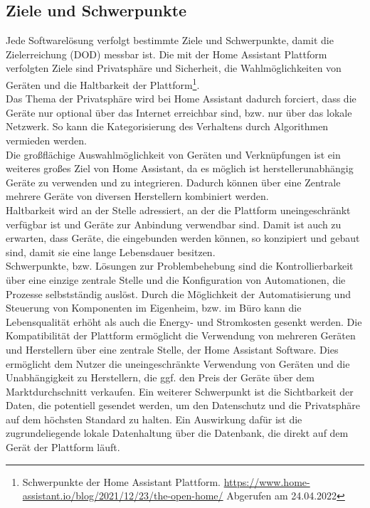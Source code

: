 \subsection{Ziele und Schwerpunkte}
    Jede Softwarelösung verfolgt bestimmte Ziele und Schwerpunkte, damit die Zielerreichung (\ac{DOD}) messbar ist. Die mit 
    der Home Assistant Plattform verfolgten Ziele sind Privatsphäre und Sicherheit, die Wahlmöglichkeiten von Geräten und die Haltbarkeit 
    der Plattform\footnote{Schwerpunkte der Home Assistant Plattform. \url{https://www.home-assistant.io/blog/2021/12/23/the-open-home/} Abgerufen am 24.04.2022}. 
    \\
    \linebreak
    Das Thema der Privatsphäre wird bei Home Assistant dadurch forciert, dass die Geräte nur optional über das Internet erreichbar sind, bzw. 
    nur über das lokale Netzwerk. So kann die Kategorisierung des Verhaltens durch Algorithmen vermieden werden. 
    \\
    Die großflächige Auswahlmöglichkeit von Geräten und Verknüpfungen ist ein weiteres großes Ziel von Home Assistant, da es möglich ist  
    herstellerunabhängig Geräte zu verwenden und zu integrieren. Dadurch können über eine Zentrale mehrere Geräte von diversen Herstellern 
    kombiniert werden.
    \\
    Haltbarkeit wird an der Stelle adressiert, an der die Plattform uneingeschränkt verfügbar ist und Geräte zur Anbindung verwendbar sind. 
    Damit ist auch zu erwarten, dass Geräte, die eingebunden werden können, so konzipiert und gebaut sind, damit sie eine lange Lebensdauer 
    besitzen.
    \\
    \linebreak
    Schwerpunkte, bzw. Lösungen zur Problembehebung sind die Kontrollierbarkeit über eine einzige zentrale Stelle und die Konfiguration von 
    Automationen, die Prozesse selbstständig auslöst. Durch die Möglichkeit der Automatisierung und Steuerung von Komponenten im Eigenheim, 
    bzw. im Büro kann die Lebensqualität erhöht als auch die Energy- und Stromkosten gesenkt werden. Die Kompatibilität der Plattform 
    ermöglicht die Verwendung von mehreren Geräten und Herstellern über eine zentrale Stelle, der Home Assistant Software. Dies ermöglicht 
    dem Nutzer die uneingeschränkte Verwendung von Geräten und die Unabhängigkeit zu Herstellern, die ggf. den Preis der Geräte über dem 
    Marktdurchschnitt verkaufen. Ein weiterer Schwerpunkt ist die Sichtbarkeit der Daten, die potentiell gesendet werden, um den Datenschutz 
    und die Privatsphäre auf dem höchsten Standard zu halten. Ein Auswirkung dafür ist die zugrundeliegende lokale Datenhaltung über die 
    Datenbank, die direkt auf dem Gerät der Plattform läuft.

